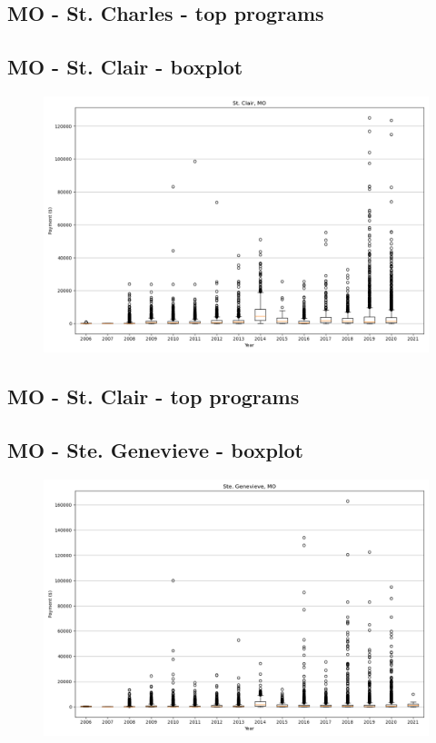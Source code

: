 \subsection*{MO - St. Charles - top programs}

\newpage
\subsection*{MO - St. Clair - boxplot}
\begin{figure}[h]
\centering
\includegraphics[width=7in]{../output/boxplots/counties/St. Clair-MO_boxplot.png}
\end{figure}


\subsection*{MO - St. Clair - top programs}

\newpage
\subsection*{MO - Ste. Genevieve - boxplot}
\begin{figure}[h]
\centering
\includegraphics[width=7in]{../output/boxplots/counties/Ste. Genevieve-MO_boxplot.png}
\end{figure}


